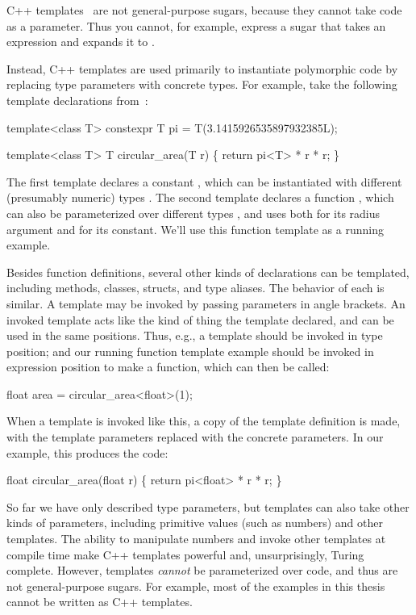 C++ templates~\cite{cpp-standard} are not general-purpose sugars,
because they cannot take code as a parameter. Thus you cannot, for
example, express a sugar that takes an expression  and expands
it to .

Instead, C++ templates are used
primarily to instantiate polymorphic code by replacing type parameters
with concrete types.  For example, take the following template declarations
from~\cite[page 344]{cpp-standard}:
\begin{Codes}
template<class T>
constexpr T pi = T(3.1415926535897932385L);

template<class T>
T circular_area(T r) \{
  return pi<T> * r * r;
\}
\end{Codes}
The first template declares a constant , which can be
instantiated with different (presumably numeric) types .
The second template declares a function , which
can also be parameterized over different types , and uses
 both for its radius argument and for its  constant.
We'll use this function template as a running example.

Besides function definitions, several other kinds of declarations can
be templated, including methods, classes, structs, and type aliases.
The behavior of each is similar. A template may be invoked by passing
parameters in angle brackets. An invoked template acts like the
kind of thing the template declared, and can be used in the same
positions. Thus, e.g., a  template should be invoked in type
position; and our running function template example should be invoked
in expression position to make a function, which can then be called:
\begin{Codes}
  float area = circular_area<float>(1);
\end{Codes}
When a template is invoked like this, a copy of the template
definition is made, with the template parameters replaced with the
concrete parameters.
In our example, this produces the code:
\begin{Codes}
float circular_area(float r) \{
  return pi<float> * r * r;
\}
\end{Codes}

So far we have only described type parameters, but templates can also
take other kinds of parameters, including primitive values (such as
numbers) and other templates. The ability to manipulate numbers and
invoke other templates at compile time make C++ templates powerful
and, unsurprisingly, Turing complete. However, templates \emph{cannot}
be parameterized over code, and thus are not general-purpose sugars.
For example, most of the examples in this thesis cannot be written as
C++ templates.

